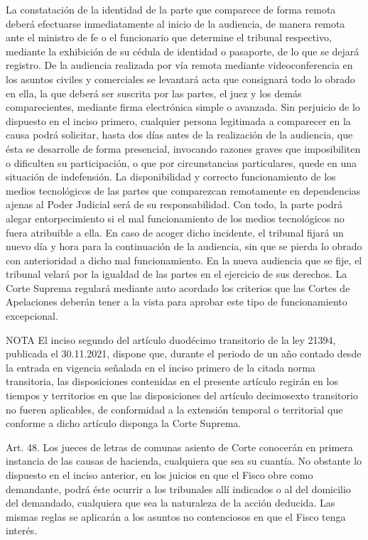     La constatación de la identidad de la parte que comparece de forma remota deberá efectuarse inmediatamente al inicio de la audiencia, de manera remota ante el ministro de fe o el funcionario que determine el tribunal respectivo, mediante la exhibición de su cédula de identidad o pasaporte, de lo que se dejará registro.
    De la audiencia realizada por vía remota mediante videoconferencia en los asuntos civiles y comerciales se levantará acta que consignará todo lo obrado en ella, la que deberá ser suscrita por las partes, el juez y los demás comparecientes, mediante firma electrónica simple o avanzada.
    Sin perjuicio de lo dispuesto en el inciso primero, cualquier persona legitimada a comparecer en la causa podrá solicitar, hasta dos días antes de la realización de la audiencia, que ésta se desarrolle de forma presencial, invocando razones graves que imposibiliten o dificulten su participación, o que por circunstancias particulares, quede en una situación de indefensión.
    La disponibilidad y correcto funcionamiento de los medios tecnológicos de las partes que comparezcan remotamente en dependencias ajenas al Poder Judicial será de su responsabilidad. Con todo, la parte podrá alegar entorpecimiento si el mal funcionamiento de los medios tecnológicos no fuera atribuible a ella. En caso de acoger dicho incidente, el tribunal fijará un nuevo día y hora para la continuación de la audiencia, sin que se pierda lo obrado con anterioridad a dicho mal funcionamiento. En la nueva audiencia que se fije, el tribunal velará por la igualdad de las partes en el ejercicio de sus derechos.
    La Corte Suprema regulará mediante auto acordado los criterios que las Cortes de Apelaciones deberán tener a la vista para aprobar este tipo de funcionamiento excepcional.



NOTA
      El inciso segundo del artículo duodécimo transitorio de la ley 21394, publicada el 30.11.2021, dispone que, durante el periodo de un año contado desde la entrada en vigencia señalada en el inciso primero de la citada norma transitoria, las disposiciones contenidas en el presente artículo regirán en los tiempos y territorios en que las disposiciones del artículo decimosexto transitorio no fueren aplicables, de conformidad a la extensión temporal o territorial que conforme a dicho artículo disponga la Corte Suprema.

    Art. 48. Los jueces de letras de comunas asiento de Corte conocerán en primera instancia de las causas de hacienda, cualquiera que sea su cuantía.
    No obstante lo dispuesto en el inciso anterior, en los juicios en que el Fisco obre como demandante, podrá éste ocurrir a los tribunales allí indicados o al del domicilio del demandado, cualquiera que sea la naturaleza de la acción deducida.
    Las mismas reglas se aplicarán a los asuntos no contenciosos en que el Fisco tenga interés.


